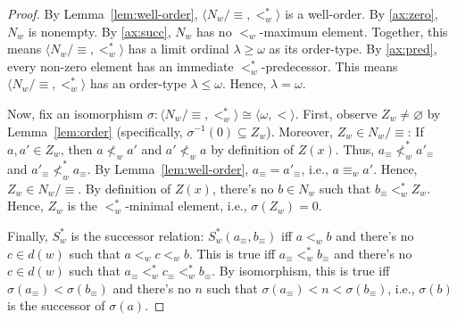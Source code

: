 \documentclass[12pt]{article}
\newcommand{\tup}[1]{\langle #1 \rangle}
\begin{document}
\begin{proof}
    By Lemma~\ref{lem:well-order}, $\tup{N_w/\equiv,<_w^*}$ is a well-order. 
    By \ref{ax:zero}, $N_w$ is nonempty. 
    By \ref{ax:succ}, $N_w$ has no $<_w$-maximum element.  
    Together, this means $\tup{N_w/\equiv,<_w^*}$ has a limit ordinal $\lambda \geq \omega$ as its order-type. 
    By \ref{ax:pred}, every non-zero element has an immediate $<_w^*$-predecessor. 
    This means $\tup{N_w/\equiv,<_w^*}$ has an order-type $\lambda \leq \omega$. 
    Hence, $\lambda = \omega$. 
    
    Now, fix an isomorphism $\sigma\colon \tup{N_w/\equiv,<_w^*} \cong \tup{\omega,<}$. 
    First, observe $Z_w \neq \varnothing$ by Lemma~\ref{lem:order} (specifically, $\sigma^{-1}(0) \subseteq Z_w$). 
    Moreover, $Z_w \in N_w/\equiv$: 
    If $a,a' \in Z_w$, then $a \nless_w a'$ and $a' \nless_w a$ by definition of $Z(x)$. 
    Thus, $a_\equiv \nless_w^* a'_\equiv$ and $a'_\equiv \nless_w^* a_\equiv$. 
    By Lemma~\ref{lem:well-order}, $a_\equiv = a'_\equiv$, i.e., $a \equiv_w a'$. 
    Hence, $Z_w \in N_w/\equiv$. 
    By definition of $Z(x)$, there's no $b \in N_w$ such that $b_\equiv <_w^* Z_w$. 
    Hence, $Z_w$ is the $<_w^*$-minimal element, i.e., $\sigma(Z_w) = 0$. 
    
    Finally, $S_w^*$ is the successor relation: 
    $S_w^*(a_\equiv,b_\equiv)$ iff $a <_w b$ and there's no $c \in d(w)$ such that $a <_w c <_w b$. 
    This is true iff $a_\equiv <_w^* b_\equiv$ and there's no $c \in d(w)$ such that $a_\equiv <_w^* c_\equiv <_w^* b_\equiv$. 
    By isomorphism, this is true iff $\sigma(a_\equiv) < \sigma(b_\equiv)$ and there's no $n$ such that $\sigma(a_\equiv) < n < \sigma(b_\equiv)$, i.e., $\sigma(b)$ is the successor of $\sigma(a)$. 
\end{proof}
\end{document}

